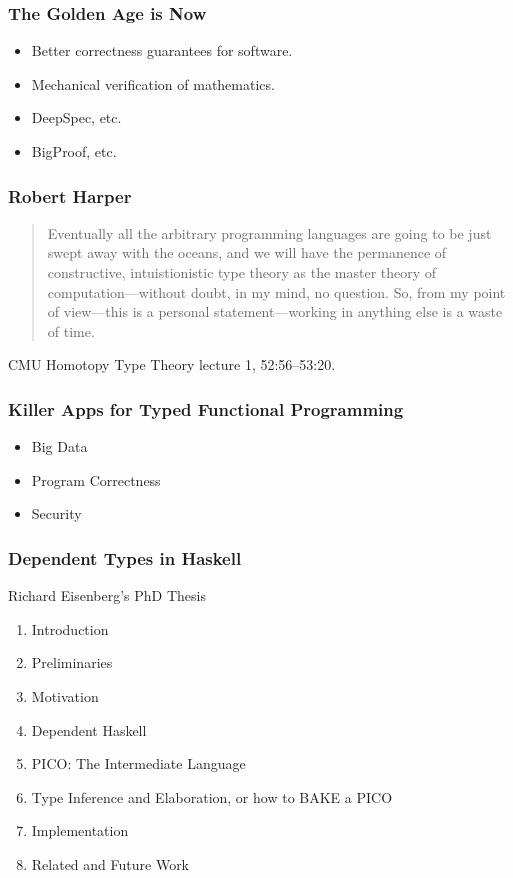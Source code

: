 \documentclass{beamer}
\begin{document}
\begin{frame}\frametitle{The Golden Age is Now}
\begin{itemize}
\item Better correctness guarantees for software.
\item Mechanical verification of mathematics.
\item DeepSpec, etc.
\item BigProof, etc.
\end{itemize}
\end{frame}

\begin{frame}\frametitle{Robert Harper}
\begin{quote}
Eventually all the arbitrary programming languages are going to be just swept away with the oceans,
and we will have the permanence of constructive, intuistionistic type theory as the master theory
of computation---without doubt, in my mind, no question.  So, from my point of view---this is a personal
statement---working in anything else is a waste of time.
\end{quote}

CMU Homotopy Type Theory lecture 1, 52:56--53:20.
\end{frame}

\begin{frame}\frametitle{Killer Apps for Typed Functional Programming}
\begin{itemize}
\item Big Data
\item Program Correctness
\item Security
\end{itemize}
\end{frame}

\begin{frame}\frametitle{Dependent Types in Haskell}
Richard Eisenberg's PhD Thesis  
\begin{enumerate}
\item Introduction
\item Preliminaries
\item Motivation
\item Dependent Haskell
\item PICO: The Intermediate Language
\item Type Inference and Elaboration, or how to BAKE a PICO
\item Implementation
\item Related and Future Work
\end{enumerate}
\end{frame}
\end{document}
